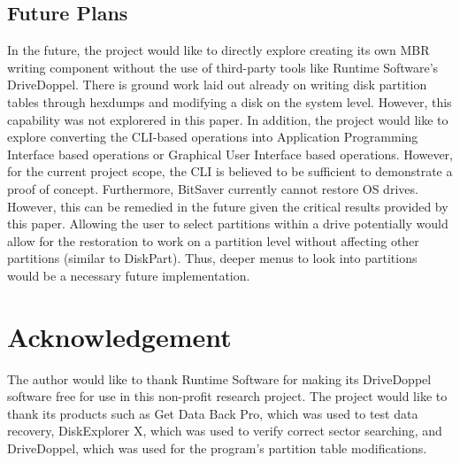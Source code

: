 \documentclass[conference]{IEEEtran} \IEEEoverridecommandlockouts
\begin{document}
\subsection{Future Plans}

In the future, the project would like to directly explore creating its own
MBR writing component without the use of third-party tools like Runtime
Software's DriveDoppel. There is ground work laid out already on writing
disk partition tables through hexdumps and modifying a disk on the system
level. However, this capability was not explorered in this paper. In addition,
the project would like to explore converting the CLI-based operations into
Application Programming Interface based operations or Graphical User Interface based operations.
However, for the current project
scope, the CLI is believed to be sufficient to demonstrate a proof of concept. Furthermore, BitSaver currently cannot restore
OS drives. However, this can be remedied in the future given the critical results provided by this paper.
Allowing the user to select partitions within a drive potentially would allow for the restoration
to work on a partition level without affecting other partitions (similar to DiskPart). 
Thus, deeper menus to look into partitions would be a necessary future implementation.

\section*{Acknowledgement}

The author would like to thank Runtime Software for making its DriveDoppel
software free for use in this non-profit research project. The project would
like to thank its products such as Get Data Back Pro, which was used to
test data recovery, DiskExplorer X, which was used to verify correct sector searching,
and DriveDoppel, which was used for the program's partition table modifications. 
\end{document}
